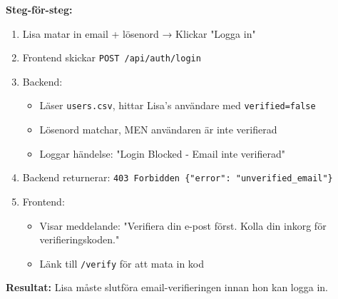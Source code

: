 \documentclass[12pt,a4paper]{article}
\begin{document}
\textbf{Steg-för-steg:}
\begin{enumerate}[noitemsep]
  \item Lisa matar in email + lösenord → Klickar "Logga in"
  \item Frontend skickar \texttt{POST /api/auth/login}
  \item Backend:
  \begin{itemize}[noitemsep]
    \item Läser \texttt{users.csv}, hittar Lisa's användare med \texttt{verified=false}
    \item Lösenord matchar, MEN användaren är inte verifierad
    \item Loggar händelse: "Login Blocked - Email inte verifierad"
  \end{itemize}
  \item Backend returnerar: \texttt{403 Forbidden \{"error": "unverified\_email"\}}
  \item Frontend:
  \begin{itemize}[noitemsep]
    \item Visar meddelande: "Verifiera din e-post först. Kolla din inkorg för verifieringskoden."
    \item Länk till \texttt{/verify} för att mata in kod
  \end{itemize}
\end{enumerate}

\textbf{Resultat:} Lisa måste slutföra email-verifieringen innan hon kan logga in.
\end{document}
